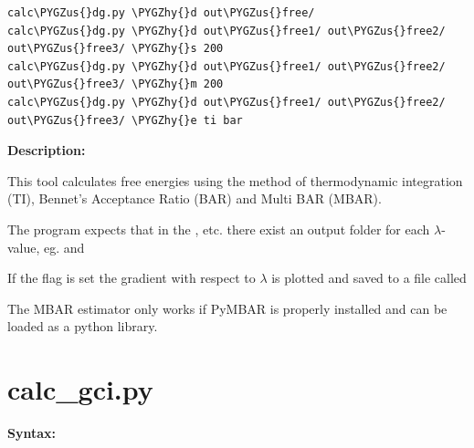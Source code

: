\documentclass[letterpaper,10pt,english]{sphinxmanual}
\def\PYGZus{\char`\_}
\def\PYGZhy{\char`\-}
\begin{document}
\begin{Verbatim}[commandchars=\\\{\}]
calc\PYGZus{}dg.py \PYGZhy{}d out\PYGZus{}free/
calc\PYGZus{}dg.py \PYGZhy{}d out\PYGZus{}free1/ out\PYGZus{}free2/ out\PYGZus{}free3/ \PYGZhy{}s 200
calc\PYGZus{}dg.py \PYGZhy{}d out\PYGZus{}free1/ out\PYGZus{}free2/ out\PYGZus{}free3/ \PYGZhy{}m 200
calc\PYGZus{}dg.py \PYGZhy{}d out\PYGZus{}free1/ out\PYGZus{}free2/ out\PYGZus{}free3/ \PYGZhy{}e ti bar
\end{Verbatim}

\textbf{Description:}

This tool calculates free energies using the method of thermodynamic integration (TI), Bennet's Acceptance Ratio (BAR) and Multi BAR (MBAR).

The program expects that in the ,  etc. there exist an output folder for each \(\lambda\)-value, eg.  and 

If the  flag is set the gradient with respect to \(\lambda\) is plotted and saved to a file called 

The MBAR estimator only works if PyMBAR is properly installed and can be loaded as a python library.


\section{calc\_gci.py}
\label{tools:calc-gci-py}
\textbf{Syntax:}
\end{document}

